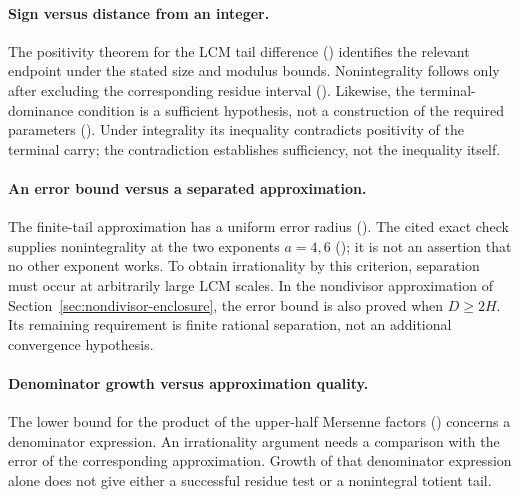 \paragraph{Sign versus distance from an integer.}
The positivity theorem for the LCM tail difference
() identifies the relevant endpoint under the stated
size and modulus bounds. Nonintegrality follows only after excluding
the corresponding residue interval
().
Likewise, the terminal-dominance condition is a sufficient hypothesis,
not a construction of the required parameters
().
Under integrality its inequality contradicts positivity of the terminal
carry; the contradiction establishes sufficiency, not the inequality itself.

\paragraph{An error bound versus a separated approximation.}
The finite-tail approximation has a uniform error radius
(). The cited exact check supplies nonintegrality at the two
exponents $a=4,6$
(); it is not an assertion that no other exponent works.
To obtain irrationality by this criterion, separation must occur at
arbitrarily large LCM scales. In the nondivisor approximation of
Section~\ref{sec:nondivisor-enclosure}, the error bound is also proved
when $D\ge2H$. Its remaining requirement is finite rational separation,
not an additional convergence hypothesis.

\paragraph{Denominator growth versus approximation quality.}
The lower bound for the product of the upper-half Mersenne factors
() concerns a denominator expression. An irrationality argument
needs a comparison with the error of the corresponding approximation.
Growth of that denominator expression alone does not give either a
successful residue test or a nonintegral totient tail.

